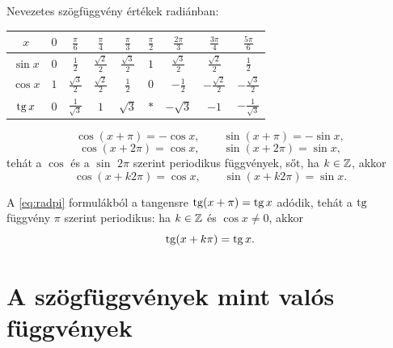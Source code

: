 \documentclass[11pt]{article}
\begin{document}
\noindent Nevezetes szögfüggvény értékek radiánban:
\begin{center}
\renewcommand{\arraystretch}{1.7}
\begin{tabular}{c|cccccccc}
\hline
$x$ & $0$ & $\frac{\pi}{6}$ & $\frac{\pi}{4}$ & $\frac{\pi}{3}$ & $\frac{\pi}{2}$
 & $\frac{2\pi}{3}$ & $\frac{3\pi}{4}$ & $\frac{5\pi}{6}$\\
\hline
$\sin x$ & $0$ & $\frac{1}{2}$ & $\frac{\sqrt{2}}{2}$ & $\frac{\sqrt{3}}{2}$ & $1$
 & $\frac{\sqrt{3}}{2}$ & $\frac{\sqrt{2}}{2}$ & $\frac{1}{2}$\\
$\cos x$ & $1$ & $\frac{\sqrt{3}}{2}$ & $\frac{\sqrt{2}}{2}$ & $\frac{1}{2}$ & $0$
 & $-\frac{1}{2}$ & $-\frac{\sqrt{2}}{2}$ & $-\frac{\sqrt{3}}{2}$\\
$\operatorname{tg} x$ & $0$ & $\frac{1}{\sqrt{3}}$ & $1$ & $\sqrt{3}$ & $\ast$
 & $-\sqrt{3}$ & $-1$ & $-\frac{1}{\sqrt{3}}$\\
\hline
\end{tabular}
\end{center}

\begin{thmbox}
\begin{theorem}[Periodicitás]
\begin{equation}\label{eq:radpi}
\cos(x+\pi)=-\cos x,\qquad \sin(x+\pi)=-\sin x,
\end{equation}
\begin{equation}\label{eq:rad2pi}
\cos(x+2\pi)=\cos x,\qquad \sin(x+2\pi)=\sin x,
\end{equation}
tehát a $\cos$ és a $\sin$ $2\pi$ szerint periodikus függvények, sőt, ha $k\in\mathbb{Z}$, akkor
\begin{equation}\label{eq:radk2pi}
\cos(x+k2\pi)=\cos x,\qquad \sin(x+k2\pi)=\sin x .
\end{equation}
\end{theorem}
\end{thmbox}

A \eqref{eq:radpi} formulákból a tangensre $\operatorname{tg}(x+\pi)=\operatorname{tg} x$ adódik, tehát a $\operatorname{tg}$ függvény $\pi$ szerint periodikus: ha $k\in\mathbb{Z}$ és $\cos x\neq 0$, akkor
\[
\operatorname{tg}(x+k\pi)=\operatorname{tg} x .
\]

\section{A szögfüggvények mint valós függvények}
\end{document}
